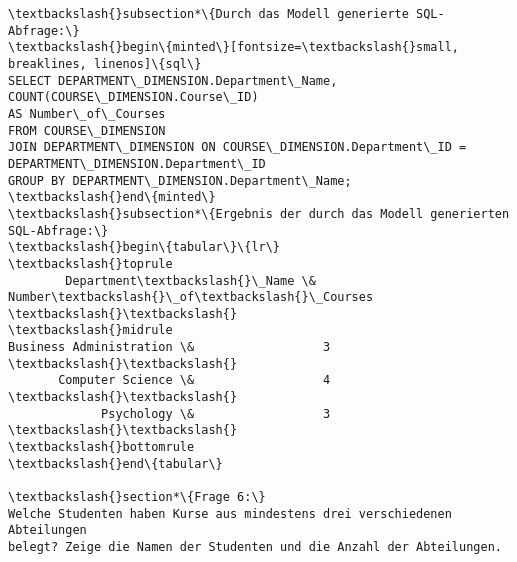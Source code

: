 \documentclass[11pt]{article}
\begin{document}
\begin{Verbatim}[commandchars=\\\{\}]
\textbackslash{}subsection*\{Durch das Modell generierte SQL-Abfrage:\}
\textbackslash{}begin\{minted\}[fontsize=\textbackslash{}small, breaklines, linenos]\{sql\}
SELECT DEPARTMENT\_DIMENSION.Department\_Name, COUNT(COURSE\_DIMENSION.Course\_ID)
AS Number\_of\_Courses
FROM COURSE\_DIMENSION
JOIN DEPARTMENT\_DIMENSION ON COURSE\_DIMENSION.Department\_ID =
DEPARTMENT\_DIMENSION.Department\_ID
GROUP BY DEPARTMENT\_DIMENSION.Department\_Name;
\textbackslash{}end\{minted\}
\textbackslash{}subsection*\{Ergebnis der durch das Modell generierten SQL-Abfrage:\}
\textbackslash{}begin\{tabular\}\{lr\}
\textbackslash{}toprule
        Department\textbackslash{}\_Name \&  Number\textbackslash{}\_of\textbackslash{}\_Courses \textbackslash{}\textbackslash{}
\textbackslash{}midrule
Business Administration \&                  3 \textbackslash{}\textbackslash{}
       Computer Science \&                  4 \textbackslash{}\textbackslash{}
             Psychology \&                  3 \textbackslash{}\textbackslash{}
\textbackslash{}bottomrule
\textbackslash{}end\{tabular\}

\textbackslash{}section*\{Frage 6:\}
Welche Studenten haben Kurse aus mindestens drei verschiedenen Abteilungen
belegt? Zeige die Namen der Studenten und die Anzahl der Abteilungen.



\end{Verbatim}
\end{document}
